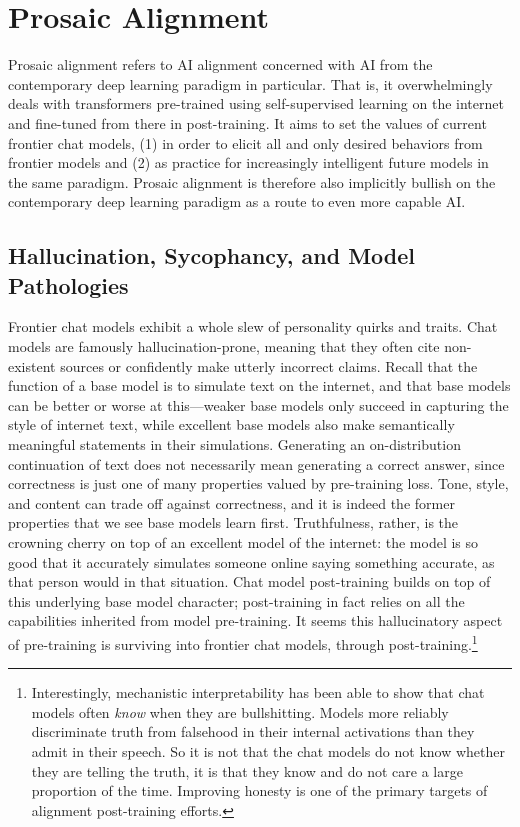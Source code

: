 \section{Prosaic Alignment}

Prosaic alignment refers to AI alignment concerned with AI from the
contemporary deep learning paradigm in particular. That is, it overwhelmingly
deals with transformers pre-trained using self-supervised learning on the
internet and fine-tuned from there in post-training. It aims to set the values
of current frontier chat models, (1) in order to elicit all and only desired
behaviors from frontier models and (2) as practice for increasingly intelligent
future models in the same paradigm. Prosaic alignment is therefore also
implicitly bullish on the contemporary deep learning paradigm as a route to
even more capable AI.

\subsection{Hallucination, Sycophancy, and Model Pathologies}
Frontier chat models exhibit a whole slew of personality quirks and traits.
Chat models are famously hallucination-prone, meaning that they often cite
non-existent sources or confidently make utterly incorrect claims. Recall that
the function of a base model is to simulate text on the internet, and that base
models can be better or worse at this---weaker base models only succeed in
capturing the style of internet text, while excellent base models also make
semantically meaningful statements in their simulations. Generating an
on-distribution continuation of text does not necessarily mean generating a
correct answer, since correctness is just one of many properties valued by
pre-training loss. Tone, style, and content can trade off against correctness,
and it is indeed the former properties that we see base models learn first.
Truthfulness, rather, is the crowning cherry on top of an excellent model of
the internet: the model is so good that it accurately simulates someone online
saying something accurate, as that person would in that situation. Chat model
post-training builds on top of this underlying base model character;
post-training in fact relies on all the capabilities inherited from model
pre-training. It seems this hallucinatory aspect of pre-training is surviving
into frontier chat models, through post-training.\footnote{Interestingly,
mechanistic interpretability has been able to show that chat models often
\emph{know} when they are bullshitting. Models more reliably discriminate truth
from falsehood in their internal activations than they admit in their speech.
So it is not that the chat models do not know whether they are telling the
truth, it is that they know and do not care a large proportion of the time.
Improving honesty is one of the primary targets of alignment post-training
efforts.}

